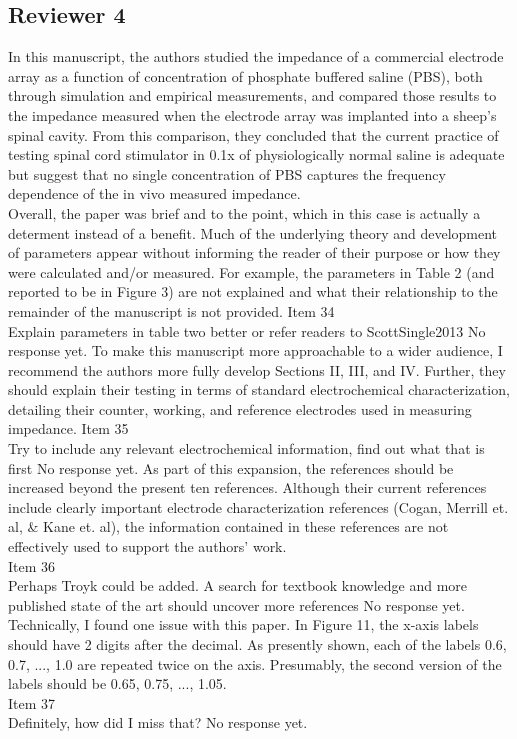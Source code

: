 \documentclass[journal, a4paper]{IEEEtran}
\begin{document}
\subsection*{Reviewer 4}
{\color{blue}
In this manuscript, the authors studied the impedance of a commercial electrode array as a function of concentration of phosphate buffered saline (PBS), both through simulation and empirical measurements, and compared those results to the impedance measured when the electrode array was implanted into a sheep's spinal cavity. From this comparison, they concluded that the current practice of testing spinal cord stimulator in 0.1x of physiologically normal saline is adequate but suggest that no single concentration of PBS captures the frequency dependence of the in vivo measured impedance.\\

Overall, the paper was brief and to the point, which in this case is actually a determent instead of a benefit. Much of the underlying theory and development of parameters appear without informing the reader of their purpose or how they were calculated and/or measured. 
For example, the parameters in Table 2 (and reported to be in Figure 3) are not explained and what their relationship to the remainder of the manuscript is not provided. 
{\color{OliveGreen}
    Item 34\\
    {\color{Red} Explain parameters in table two better or refer readers to ScottSingle2013}
    No response yet.
}
To make this manuscript more approachable to a wider audience, I recommend the authors more fully develop Sections II, III, and IV. Further, they should explain their testing in terms of standard electrochemical characterization, detailing their counter, working, and reference electrodes used in measuring impedance. 
{\color{OliveGreen}
    Item 35\\
    {\color{Red} Try to include any relevant electrochemical information, find out what that is first}
    No response yet.
}
As part of this expansion, the references should be increased beyond the present ten references. Although their current references include clearly important electrode characterization references (Cogan, Merrill et. al, & Kane et. al), the information contained in these references are not effectively used to support the authors’ work.\\
{\color{OliveGreen}
    Item 36\\
    {\color{Red} Perhaps Troyk could be added. A search for textbook knowledge and more published state of the art should uncover more references}
    No response yet.
}\\

Technically, I found one issue with this paper. In Figure 11, the x-axis labels should have 2 digits after the decimal. As presently shown, each of the labels 0.6, 0.7, ..., 1.0 are repeated twice on the axis. Presumably, the second version of the labels should be 0.65, 0.75, ..., 1.05.\\
{\color{OliveGreen}
    Item 37\\
    {\color{Red} Definitely, how did I miss that?}
    No response yet.
}\\
}
\end{document}
